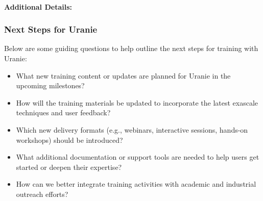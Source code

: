 \paragraph{Additional Details:}


\subsubsection{Next Steps for Uranie}
\label{sec:Uranie:next-steps}

Below are some guiding questions to help outline the next steps for training with Uranie:
\begin{itemize}
    \item What new training content or updates are planned for Uranie in the upcoming milestones?
    \item How will the training materials be updated to incorporate the latest exascale techniques and user feedback?
    \item Which new delivery formats (e.g., webinars, interactive sessions, hands-on workshops) should be introduced?
    \item What additional documentation or support tools are needed to help users get started or deepen their expertise?
    \item How can we better integrate training activities with academic and industrial outreach efforts?
\end{itemize}